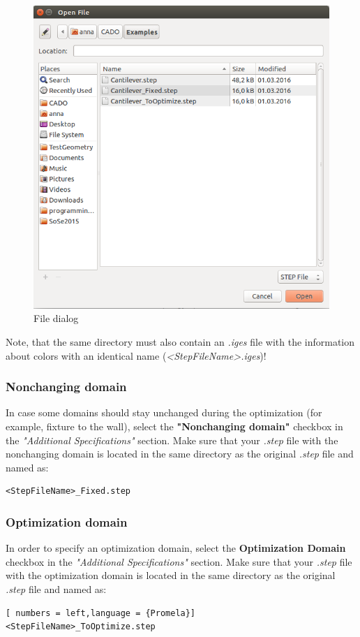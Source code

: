 \documentclass[
12pt, %
a4paper, %
oneside, %
headinclude,footinclude, %
BCOR5mm, %
]{scrartcl}
\begin{document}
\begin{figure}
\centering
\includegraphics[scale=0.4]{Pictures/chooseFileDialog.png}
\caption{File dialog}
\label{fig:fileDialog}
\end{figure} 

Note, that the same directory must also contain an \textit{.iges} file with the information about colors with an identical name (\textit{<StepFileName>.iges})! 

\subsubsection{Nonchanging domain}
In case some domains should stay unchanged during the optimization (for example, fixture to the wall), select the \textbf{"Nonchanging domain"} checkbox in the \textit{"Additional Specifications"} section. Make sure that your \textit{.step} file with the nonchanging domain is located in the same directory as the original \textit{.step} file and named as:
\begin{lstlisting}[language = {Promela}]
<StepFileName>_Fixed.step
\end{lstlisting}

\subsubsection{Optimization domain}
In order to specify an optimization domain, select the \textbf{Optimization Domain} checkbox in the \textit{"Additional Specifications"} section. Make sure that your \textit{.step} file with the optimization domain is located in the same directory as the original \textit{.step} file and named as:
\begin{lstlisting}[ numbers = left,language = {Promela}]
<StepFileName>_ToOptimize.step
\end{lstlisting}
\end{document}
